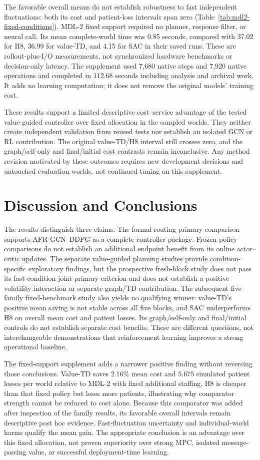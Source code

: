 \documentclass[preprint,review,12pt]{elsarticle}
\begin{document}
The favorable overall means do not establish robustness to fast independent
fluctuations: both its cost and patient-loss intervals span zero
(Table~\ref{tab:mdl2-fixed-conditions}). MDL-2 fixed support required no
planner, response filter, or neural call. Its mean complete-world time was
0.85 seconds, compared with 37.02 for H8, 36.99 for value-TD, and 4.15 for
SAC in their saved runs. These are rollout-plus-I/O measurements, not
synchronized hardware benchmarks or decision-only latency. The supplement
used 7,680 native steps and 7,920 native operations and completed in
112.68 seconds including analysis and archival work. It adds no learning
computation; it does not remove the original models' training cost.

These results support a limited descriptive cost--service advantage of the
tested value-guided controller over fixed allocation in the sampled worlds.
They neither create independent validation from reused tests nor establish
an isolated GCN or RL contribution. The original value-TD/H8 interval still
crosses zero, and the graph/self-only and final/initial cost contrasts remain
inconclusive. Any method revision motivated by these outcomes requires new
development decisions and untouched evaluation worlds, not continued tuning
on this supplement.

\section{Discussion and Conclusions}
\label{sec:conclusion}
The results distinguish three claims. The formal routing-primary comparison
supports AFR-GCN--DDPG as a complete controller package. Frozen-policy
comparisons do not establish an additional endpoint benefit from its online
actor--critic updates. The separate value-guided planning studies provide
condition-specific exploratory findings, but the prospective fresh-block study
does not pass its fast-condition joint primary criterion and does not establish
a positive volatility interaction or separate graph/TD contribution. The subsequent
five-family fixed-benchmark study also yields no qualifying winner: value-TD's
positive mean saving is not stable across all five blocks, and SAC underperforms
H8 on overall mean cost and patient losses. Its graph/self-only and final/initial
controls do not establish separate cost benefits. These are different
questions, not interchangeable demonstrations that reinforcement learning
improves a strong operational baseline.

The fixed-support supplement adds a narrower positive finding without
reversing those conclusions. Value-TD saves 2.16\% mean cost and 5.675
simulated patient losses per world relative to MDL-2 with fixed additional
staffing. H8 is cheaper than that fixed policy but loses more patients,
illustrating why comparator strength cannot be reduced to cost alone.
Because this comparator was added after inspection of the family results,
its favorable overall intervals remain descriptive post hoc evidence.
Fast-fluctuation uncertainty and individual-world harms qualify the mean
gain. The appropriate conclusion is an advantage over this fixed allocation,
not proven superiority over strong MPC, isolated message-passing value,
or successful deployment-time learning.
\end{document}
